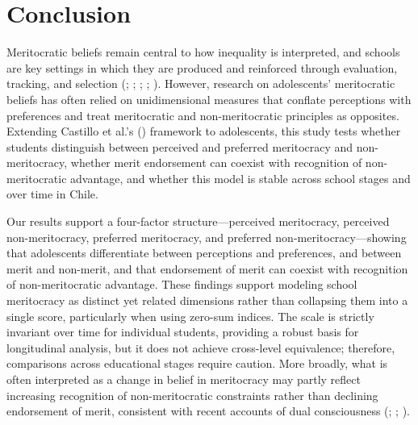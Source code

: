 \documentclass[
  13pt,
]{article}
\begin{document}
\section{Conclusion}\label{conclusion}

Meritocratic beliefs remain central to how inequality is interpreted,
and schools are key settings in which they are produced and reinforced
through evaluation, tracking, and selection
(;
;
;
;
). However,
research on adolescents' meritocratic beliefs has often relied on
unidimensional measures that conflate perceptions with preferences and
treat meritocratic and non-meritocratic principles as opposites.
Extending Castillo et al.'s
() framework to
adolescents, this study tests whether students distinguish between
perceived and preferred meritocracy and non-meritocracy, whether merit
endorsement can coexist with recognition of non-meritocratic advantage,
and whether this model is stable across school stages and over time in
Chile.

Our results support a four-factor structure---perceived meritocracy,
perceived non-meritocracy, preferred meritocracy, and preferred
non-meritocracy---showing that adolescents differentiate between
perceptions and preferences, and between merit and non-merit, and that
endorsement of merit can coexist with recognition of non-meritocratic
advantage. These findings support modeling school meritocracy as
distinct yet related dimensions rather than collapsing them into a
single score, particularly when using zero-sum indices. The scale is
strictly invariant over time for individual students, providing a robust
basis for longitudinal analysis, but it does not achieve cross-level
equivalence; therefore, comparisons across educational stages require
caution. More broadly, what is often interpreted as a change in belief
in meritocracy may partly reflect increasing recognition of
non-meritocratic constraints rather than declining endorsement of merit,
consistent with recent accounts of dual consciousness
(;
;
).
\end{document}
